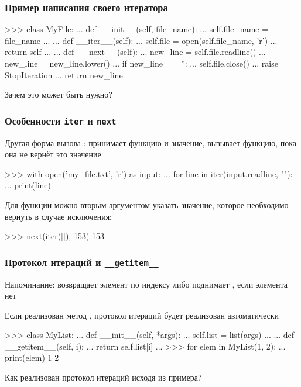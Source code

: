 \documentclass[fleqn, xcolor=x11names]{beamer}
\begin{document}
\begin{frame}[fragile]\frametitle{Пример написания своего итератора}
\begin{pcode}
>>> class MyFile:
...    def __init__(self, file_name):
...         self.file_name = file_name
...        
...     def __iter__(self):
...         self.file = open(self.file_name, 'r')
...         return self
...     
...     def __next__(self):
...         new_line = self.file.readline()
...         new_line = new_line.lower()
...         if new_line == '':
...             self.file.close()
...             raise StopIteration
...         return new_line
\end{pcode}

Зачем это может быть нужно?
\end{frame}

\begin{frame}[fragile]\frametitle{Особенности \texttt{iter} и \texttt{next}}
Другая форма вызова : принимает функцию и значение, вызывает функцию, пока она не вернёт это значение
\begin{pcode}
>>> with open('my_file.txt', 'r') as input:
...     for line in iter(input.readline, ""):
...         print(line)
\end{pcode}

\hfill

Для функции  можно вторым аргументом указать значение, которое необходимо вернуть в случае исключения:
\begin{pcode}
>>> next(iter([]), 153)
153
\end{pcode}
\end{frame}

\begin{frame}[fragile]\frametitle{Протокол итераций и \texttt{\_\_getitem\_\_}}
Напоминание:  возвращает элемент по индексу либо поднимает , если элемента нет

\hfill

Если реализован метод , протокол итераций будет реализован автоматически

\begin{pcode}
>>> class MyList:
...    def __init__(self, *args):
...        self.list = list(args)
...        
...    def __getitem__(self, i): 
...        return self.list[i] 
...
>>> for elem in MyList(1, 2):
...     print(elem)
1
2
\end{pcode}

Как реализован протокол итераций исходя из примера? 
\end{frame}
\end{document}
